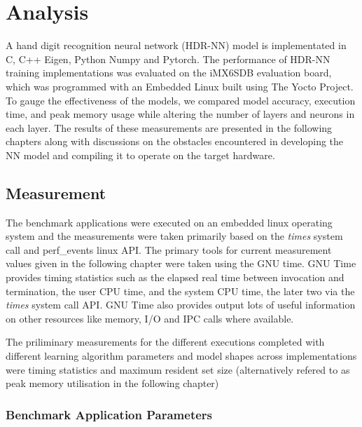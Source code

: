 \part{Analysis}

A hand digit recognition neural network (HDR-NN) model is implementated in C, C++ Eigen, Python Numpy and Pytorch. The performance of HDR-NN training implementations was evaluated on the iMX6SDB evaluation board, which was programmed with an Embedded Linux built using The Yocto Project. To gauge the effectiveness of the models, we compared model accuracy, execution time, and peak memory usage while altering the number of layers and neurons in each layer. The results of these measurements are presented in the following chapters along with discussions on the obstacles encountered in developing the NN model and compiling it to operate on the target hardware.


\chapter{Measurement}

The benchmark applications were executed on an embedded linux operating system and the measurements were taken primarily based on the \textit{times} system call and perf\_events linux API. The primary tools for current measurement values given in the following chapter were taken using the GNU time. GNU Time provides timing statistics such as the elapsed real time between invocation and termination, the user CPU time, and the system CPU time, the later two via the \textit{times} system call API. GNU Time also provides output lots of useful information on other resources like memory, I/O and IPC calls where available.

The priliminary measurements for the different executions completed with different learning algorithm parameters and model shapes across implementations were timing statistics and maximum resident set size (alternatively refered to as peak memory utilisation in the following chapter)

\section{Benchmark Application Parameters}

